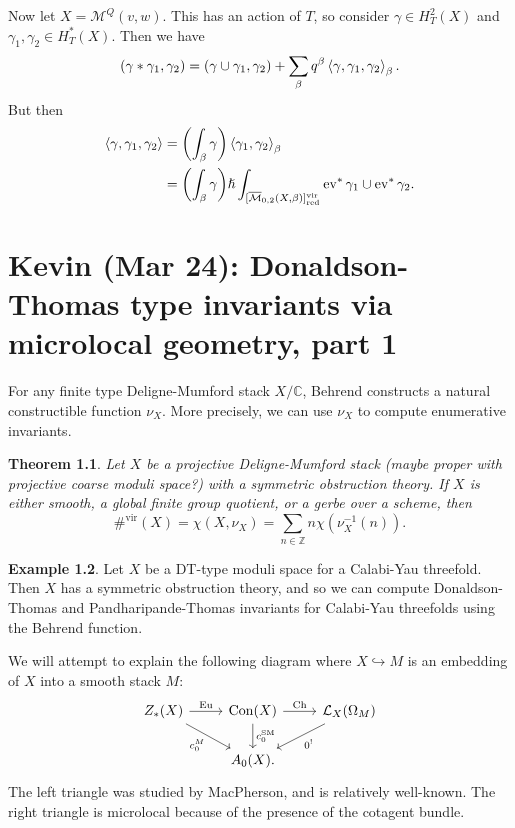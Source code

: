 \documentclass[leqno, openany]{memoir}
\newtheorem{thm}{Theorem}[section]
\theoremstyle{definition}
\newtheorem{exm}[thm]{Example}
\theoremstyle{remark}
\theoremstyle{plain}
\theoremstyle{definition}
\theoremstyle{remark}
\newcommand{\C}{\mathbb{C}}
\newcommand{\Z}{\mathbb{Z}}
\newcommand{\mc}[1]{\mathcal{#1}}
\newcommand{\mr}[1]{\mathrm{#1}}
\newcommand{\on}[1]{\operatorname{#1}}
\newcommand{\ol}[1]{\overline{#1}}
\begin{document}
Now let $X = \mc{M}^Q(v, w)$. This has an action of $T$, so consider $\gamma \in H_T^2(X)$ and $\gamma_1, \gamma_2 \in H_T^*(X)$. Then we have
\[ (\gamma * \gamma_1, \gamma_2) = (\gamma \cup \gamma_1, \gamma_2) + \sum_{\beta} q^{\beta} \ev{\gamma, \gamma_1, \gamma_2}_{\beta}. \]
But then 
\begin{align*}
    \ev{\gamma, \gamma_1, \gamma_2} &= \qty(\int_{\beta} \gamma) \ev{\gamma_1, \gamma_2}_{\beta} \\
    &= \qty(\int_{\beta} \gamma) \hslash \int_{[\ol{\mc{M}}_{0,2}(X, \beta)]_{\mr{red}}^{\mr{vir}}} \on{ev}^* \gamma_1 \cup \on{ev}^* \gamma_2.
\end{align*}

\chapter{Kevin (Mar 24): Donaldson-Thomas type invariants via microlocal geometry, part 1}%

For any finite type Deligne-Mumford stack $X/\C$, Behrend constructs a natural constructible function $\nu_X$. More precisely, we can use $\nu_X$ to compute enumerative invariants.

\begin{thm}
    Let $X$ be a projective Deligne-Mumford stack (maybe proper with projective coarse moduli space?) with a symmetric obstruction theory. If $X$ is either smooth, a global finite group quotient, or a gerbe over a scheme, then
    \[ \#^{\mr{vir}}(X) = \chi(X, \nu_X) = \sum_{n \in \Z} n \chi(\nu_X^{-1}(n)). \]
\end{thm}

\begin{exm}
    Let $X$ be a DT-type moduli space for a Calabi-Yau threefold. Then $X$ has a symmetric obstruction theory, and so we can compute Donaldson-Thomas and Pandharipande-Thomas invariants for Calabi-Yau threefolds using the Behrend function.
\end{exm}

We will attempt to explain the following diagram where $X \hookrightarrow M$ is an embedding of $X$ into a smooth stack $M$:
\begin{equation}\label{eqn:behrend}
\begin{tikzcd}
    Z_*(X) \ar{r}{\mr{Eu}} \ar[swap]{dr}{c_0^M} & \mr{Con}(X) \ar{d}{c_0^{\mr{SM}}} \ar{r}{\mr{Ch}} & \mc{L}_X(\Omega_M) \ar{dl}{0^!} \\
    & A_0(X).
\end{tikzcd}
\end{equation}
The left triangle was studied by MacPherson, and is relatively well-known. The right triangle is microlocal because of the presence of the cotagent bundle.
\end{document}
